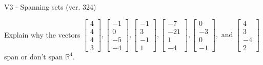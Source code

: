 \begin{exercise}
  \begin{exerciseTitle}V3 - Spanning sets (ver. 324)\end{exerciseTitle}
  \begin{exerciseStatement}
    Explain why the vectors \(\left[\begin{array}{r}
4 \\
4 \\
4 \\
3
\end{array}\right] , \left[\begin{array}{r}
-1 \\
0 \\
-5 \\
-4
\end{array}\right] , \left[\begin{array}{r}
-1 \\
3 \\
-1 \\
1
\end{array}\right] , \left[\begin{array}{r}
-7 \\
-21 \\
1 \\
-4
\end{array}\right] , \left[\begin{array}{r}
0 \\
-3 \\
0 \\
-1
\end{array}\right] , \text{ and } \left[\begin{array}{r}
4 \\
3 \\
-4 \\
2
\end{array}\right]\) span or don't span \(\mathbb{R}^4\). 
	



\end{exerciseStatement}
\end{exercise}
